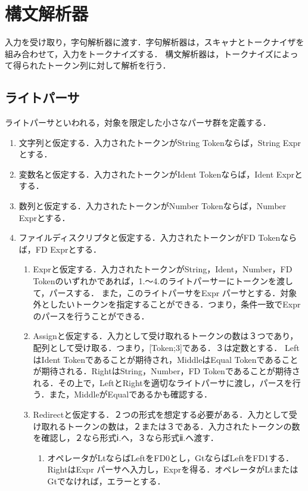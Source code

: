 \documentclass{article}
\begin{document}
\section{構文解析器}
入力を受け取り，字句解析器に渡す．字句解析器は，スキャナとトークナイザを組み合わせて，入力をトークナイズする．\newline
構文解析器は，トークナイズによって得られたトークン列に対して解析を行う．

\subsection{ライトパーサ}
ライトパーサといわれる，対象を限定した小さなパーサ群を定義する．

\begin{enumerate}
    \item 文字列と仮定する．入力されたトークンがString Tokenならば，String Exprとする．
    \item 変数名と仮定する．入力されたトークンがIdent Tokenならば，Ident Exprとする．
    \item 数列と仮定する．入力されたトークンがNumber Tokenならば，Number Exprとする．
    \item ファイルディスクリプタと仮定する．入力されたトークンがFD Tokenならば，FD Exprとする．
    \begin{enumerate}
        \item Exprと仮定する．入力されたトークンがString，Ident，Number，FD Tokenのいずれかであれば，1.〜4.のライトパーサーにトークンを渡して，パースする．\newline
        また，このライトパーサをExpr パーサとする．対象外としたいトークンを指定することができる．つまり，条件一致でExprのパースを行うことができる．
        \item Assignと仮定する．入力として受け取れるトークンの数は３つであり，配列として受け取る．つまり，[Token;3]である．３は定数とする．\newline
        LeftはIdent Tokenであることが期待され，MiddleはEqual Tokenであることが期待される．RightはString，Number，FD Tokenであることが期待される．その上で，LeftとRightを適切なライトパーサに渡し，パースを行う．また，MiddleがEqualであるかも確認する．
        \item Redirectと仮定する．２つの形式を想定する必要がある．入力として受け取れるトークンの数は，２または３である．入力されたトークンの数を確認し，２なら形式ⅰ.へ，３なら形式ⅱ.へ渡す．
        \begin{enumerate}
            \item オペレータがLtならばLeftをFD0とし，GtならばLeftをFD1する．RightはExpr パーサへ入力し，Exprを得る．オペレータがLtまたはGtでなければ，エラーとする．

\end{enumerate}
\end{enumerate}
\end{enumerate}
\end{document}

